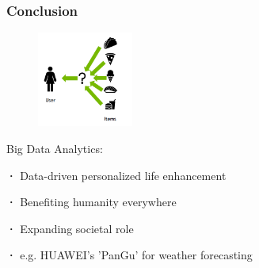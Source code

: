 \documentclass{beamer}
\begin{document}
\begin{frame}
  \frametitle{Conclusion}
  
  \begin{figure}
    \includegraphics[width=0.28\textwidth]{figure 3.png}
    \label{fig:bigdata_conclusion}
  \end{figure}

  {\Large Big Data Analytics:}
  
  \vspace{2 em}
  
  {\large \textbf{·} Data-driven personalized life enhancement}
  
  \vspace{1.5 em}
  
  {\large \textbf{·} Benefiting humanity everywhere}
  
  \vspace{1.5 em}
  
  {\large \textbf{·} Expanding societal role}

  \vspace{1.25 em}
  
  {\large \textbf{·} e.g. HUAWEI's 'PanGu' for weather forecasting}

\end{frame}
\end{document}
